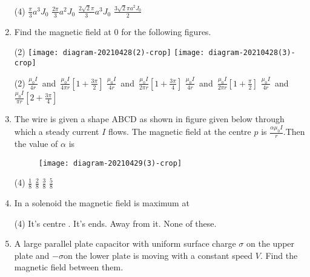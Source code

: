 \begin{enumerate}[ label=\color{ocre}\textbf{\arabic*.}]
	\begin{tasks}(4)
		\task[\textbf{a.}] $\frac{\pi}{3}a^3 J_0$
		\task[\textbf{b.}]$\frac{2\pi}{3}a^2 J_0$
		\task[\textbf{c.}] $\frac{2 \sqrt{2}\pi}{3}a^3 J_0$
		\task[\textbf{d.}]  $\frac{3 \sqrt{2}\pi a^2 J_0}{2}$
	\end{tasks}
	\item Find the magnetic field at $0$ for the following figures.
	\begin{tasks}(2)
		\task[\textbf{(a)}]	\texttt{[image: diagram-20210428(2)-crop]} 
		\task[\textbf{(b)}] \texttt{[image: diagram-20210428(3)-crop]} 
	\end{tasks}
	\begin{tasks}(2)
		\task[\textbf{a.}] $\frac{\mu_{0} I}{4r}$\ and\ $\frac{\mu_{0} I}{4\pi r}[1+\frac{3\pi}{2}]$
		\task[\textbf{b.}] $\frac{\mu_{0} I}{4r}$\ and\ $\frac{\mu_{0} I}{2\pi r}[1+\frac{3\pi}{4}]$
		\task[\textbf{c.}] $\frac{\mu_{0} I}{4r}$\ and\ $\frac{\mu_{0} I}{2\pi r}[1+\frac{\pi}{2}]$
		\task[\textbf{d.}] $\frac{\mu_{0} I}{4r}$\ and\ $\frac{\mu_{0} I}{\pi r}[2+\frac{3\pi}{4}]$
	\end{tasks}
	\item The wire is given a shape ABCD as shown in figure given below through which a steady current $I$ flows. The magnetic field at the centre $p$ is $\frac{\alpha\mu_{0} I}{r}$.Then the value of $\alpha$ is
	\begin{figure}[H]
		\begin{center}
			\texttt{[image: diagram-20210429(3)-crop]}
		\end{center}
	\end{figure}
	\begin{tasks}(4)
		\task[\textbf{a.}]$\frac{1}{8}$
		\task[\textbf{b.}]$\frac{2}{8}$
		\task[\textbf{c.}]$\frac{3}{8}$
		\task[\textbf{d.}]  $\frac{5}{8}$
	\end{tasks}
	\item In a solenoid the magnetic field is maximum at 
	\begin{tasks}(4)
		\task[\textbf{a.}]  It's centre .
		\task[\textbf{b.}]  It's ends.
		\task[\textbf{c.}]Away from it. 
		\task[\textbf{d.}] None of these.
	\end{tasks}
	\item A large parallel plate capacitor with uniform surface charge $\sigma$ on the upper plate and $-\sigma$on the lower plate is moving with a constant speed $V$. Find the magnetic field between them.
	\begin{figure}[H]

\end{figure}
\end{enumerate}
